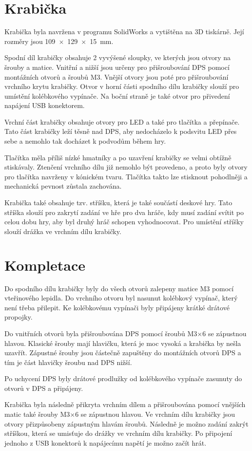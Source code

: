 \chapter{Krabička}
Krabička byla navržena v programu SolidWorks a vytištěna na 3D tiskárně. Její rozměry jsou 109~$\times$~129~$\times$~15~mm. 

Spodní díl krabičky obsahuje 2 vyvýšené sloupky, ve kterých jsou otvory
na šrouby a matice. Vnitřní a nižší jsou určeny pro přišroubování DPS pomocí montážních otvorů a šroubů M3. Vnější otvory jsou poté pro přišroubování 
vrchního krytu krabičky. Otvor v horní části spodního dílu krabičky slouží pro umístění kolébkového vypínače. Na boční straně je také otvor
pro přivedení napájení USB konektorem.

Vrchní část krabičky obsahuje otvory pro LED a také pro tlačítka a přepínače. Tato část krabičky leží těsně nad DPS, aby nedocházelo k podsvitu LED přes
sebe a nemohlo tak docházet k podvodům během hry. 

Tlačítka měla příliš nízké hmatníky a po uzavření krabičky se velmi obtížně stiskávaly. 
Ztenčení vrchního dílu již nemohlo být provedeno, a proto byly otvory pro tlačítka navrženy v kónickém tvaru. Tlačítka takto lze stisknout pohodlněji
a mechanická pevnost zůstala zachována. 

Krabička také obsahuje tzv. stříšku, která je také součástí deskové hry. Tato stříška slouží pro zakrytí zadání ve hře pro dva hráče, kdy 
musí zadání svítit po celou dobu hry, aby byl druhý hráč schopen vyhodnocovat. Pro umístění stříšky slouží drážka ve vrchním dílu krabičky.


\chapter{Kompletace} 
Do spodního dílu krabičky byly do všech otvorů zalepeny matice M3 pomocí vteřinového lepidla. Do vrchního otvoru byl nasunut kolébkový vypínač, který
není třeba přilepit. Ke kolébkovému vypínači byly připájeny krátké drátové propojky.  

Do vnitřních otvorů byla přišroubována DPS pomocí šroubů M3$\times$6 se zápustnou hlavou. Klasické šrouby mají hlavičku, která je moc vysoká a krabička 
by nešla uzavřít. Zápustné šrouby jsou částečně zapuštěny do montážních otvorů DPS a tím je část hlavičky šroubu nad DPS nižší. 

Po uchycení DPS byly drátové prodlužky od kolébkového vypínače zasunuty do otvorů v DPS a připájeny.

Krabička byla následně přikryta vrchním dílem a přišroubována pomocí vnějších matic také šrouby M3$\times$6 se zápustnou hlavou. Ve vrchním dílu krabičky 
jsou otvory přizpůsobeny zápustným hlavám šroubů. Následně je možno zadání zakrýt stříškou, která se umisťuje do drážky ve vrchním dílu krabičky.
Po připojení jednoho z USB konektorů k napájecímu napětí je možno začít hrát.  
